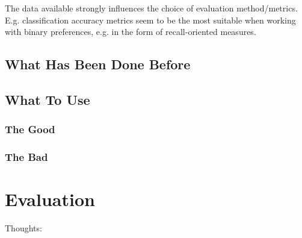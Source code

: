 The data available strongly influences the choice of evaluation method/metrics.
E.g. classification accuracy metrics seem to be the most suitable when working
with binary preferences, e.g. in the form of recall-oriented measures.

\subsection{What Has Been Done Before}



\subsection{What To Use}
\subsubsection{The Good}
\subsubsection{The Bad}

\section{Evaluation}



Thoughts:

